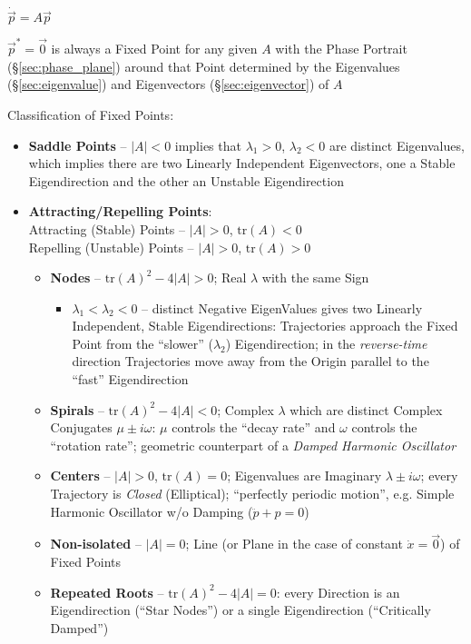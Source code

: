 $\dot{\vec{p}} = A\vec{p}$

$\vec{p}^* = \vec{0}$ is always a Fixed Point for any given $A$ with the Phase
Portrait (\S\ref{sec:phase_plane}) around that Point determined by the
Eigenvalues (\S\ref{sec:eigenvalue}) and Eigenvectors (\S\ref{sec:eigenvector})
of $A$

Classification of Fixed Points:
\begin{itemize}
  \item \textbf{Saddle Points} -- $|A| < 0$ implies that $\lambda_1 > 0$,
    $\lambda_2 < 0$ are distinct Eigenvalues, which implies there are two
    Linearly Independent Eigenvectors, one a Stable Eigendirection and the
    other an Unstable Eigendirection
  \item \textbf{Attracting/Repelling Points}: \\
    Attracting (Stable) Points -- $|A| > 0$, $\mathrm{tr}(A) < 0$ \\
    Repelling (Unstable) Points -- $|A| > 0$, $\mathrm{tr}(A) > 0$
    \begin{itemize}
      \item \textbf{Nodes} -- $\mathrm{tr}(A)^2 - 4|A| > 0$; Real $\lambda$
        with the same Sign
        \begin{itemize}
          \item $\lambda_1 < \lambda_2 < 0$ -- distinct Negative EigenValues
            gives two Linearly Independent, Stable Eigendirections:
            Trajectories approach the Fixed Point from the ``slower''
            ($\lambda_2$) Eigendirection; in the \emph{reverse-time} direction
            Trajectories move away from the Origin parallel to the ``fast''
            Eigendirection
        \end{itemize}
      \item \textbf{Spirals} -- $\mathrm{tr}(A)^2 - 4|A| < 0$; Complex
        $\lambda$ which are distinct Complex Conjugates $\mu \pm{i\omega}$:
        $\mu$ controls the ``decay rate'' and $\omega$ controls the ``rotation
        rate''; geometric counterpart of a \emph{Damped Harmonic Oscillator}
      \item \textbf{Centers} -- $|A| > 0$, $\mathrm{tr}(A) = 0$; Eigenvalues
        are Imaginary $\lambda \pm i\omega$; every Trajectory is \emph{Closed}
        (Elliptical); ``perfectly periodic motion'', e.g. Simple Harmonic
        Oscillator w/o Damping ($\ddot{p} + p = 0$)
      \item \textbf{Non-isolated} -- $|A| = 0$; Line (or Plane in the case of
        constant $\dot{x} = \vec{0}$) of Fixed Points
      \item \textbf{Repeated Roots} -- $\mathrm{tr}(A)^2 - 4|A| = 0$: every
        Direction is an Eigendirection (``Star Nodes'') or a single
        Eigendirection (``Critically Damped'')
    \end{itemize}
\end{itemize}

